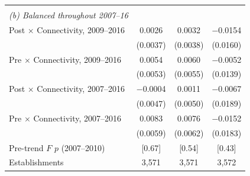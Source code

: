 \begin{table}[!htbp]
\begin{threeparttable}
\begin{tabular}{lccc}
 & & & \\
\textit{(b) Balanced throughout 2007--16} & & & \\
\quad Post $\times$ Connectivity, 2009--2016 & 0.0026 & 0.0032 & $-$0.0154 \\
 & (0.0037) & (0.0038) & (0.0160) \\
\quad Pre $\times$ Connectivity, 2009--2016 & 0.0054 & 0.0060 & $-$0.0052 \\
 & (0.0053) & (0.0055) & (0.0139) \\
\quad Post $\times$ Connectivity, 2007--2016 & $-$0.0004 & 0.0011 & $-$0.0067 \\
 & (0.0047) & (0.0050) & (0.0189) \\
\quad Pre $\times$ Connectivity, 2007--2016 & 0.0083 & 0.0076 & $-$0.0152 \\
 & (0.0059) & (0.0062) & (0.0183) \\
\quad Pre-trend $F$ $p$ (2007--2010) & [0.67] & [0.54] & [0.43] \\
\quad Establishments & 3{,}571 & 3{,}571 & 3{,}572 \\
\bottomrule
\end{tabular}
\scriptsize
\begin{tablenotes}

\end{tablenotes}
\end{threeparttable}
\end{table}
